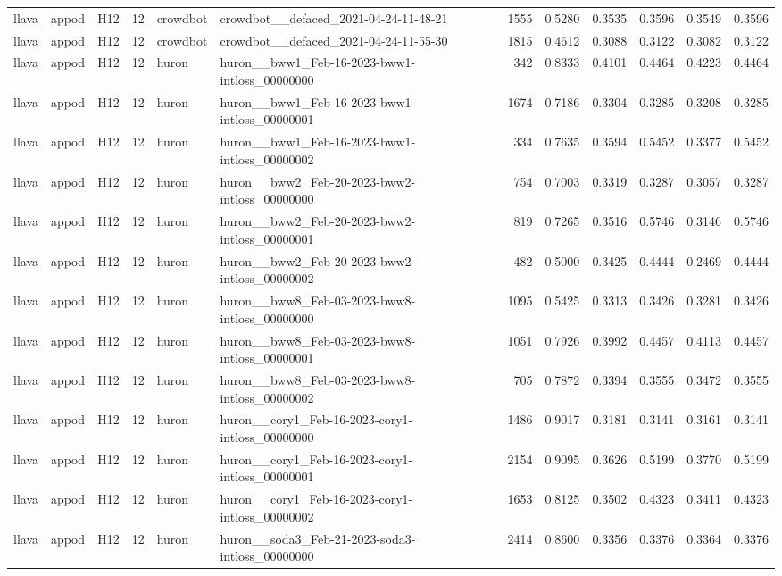 \begin{table}[tbp]
\begin{tabular}{lllrllrrrrrr}
llava & appod & H12 & 12 & crowdbot & crowdbot\_\_defaced\_2021-04-24-11-48-21 & 1555 & 0.5280 & 0.3535 & 0.3596 & 0.3549 & 0.3596 \\
llava & appod & H12 & 12 & crowdbot & crowdbot\_\_defaced\_2021-04-24-11-55-30 & 1815 & 0.4612 & 0.3088 & 0.3122 & 0.3082 & 0.3122 \\
llava & appod & H12 & 12 & huron & huron\_\_bww1\_Feb-16-2023-bww1-intloss\_00000000 & 342 & 0.8333 & 0.4101 & 0.4464 & 0.4223 & 0.4464 \\
llava & appod & H12 & 12 & huron & huron\_\_bww1\_Feb-16-2023-bww1-intloss\_00000001 & 1674 & 0.7186 & 0.3304 & 0.3285 & 0.3208 & 0.3285 \\
llava & appod & H12 & 12 & huron & huron\_\_bww1\_Feb-16-2023-bww1-intloss\_00000002 & 334 & 0.7635 & 0.3594 & 0.5452 & 0.3377 & 0.5452 \\
llava & appod & H12 & 12 & huron & huron\_\_bww2\_Feb-20-2023-bww2-intloss\_00000000 & 754 & 0.7003 & 0.3319 & 0.3287 & 0.3057 & 0.3287 \\
llava & appod & H12 & 12 & huron & huron\_\_bww2\_Feb-20-2023-bww2-intloss\_00000001 & 819 & 0.7265 & 0.3516 & 0.5746 & 0.3146 & 0.5746 \\
llava & appod & H12 & 12 & huron & huron\_\_bww2\_Feb-20-2023-bww2-intloss\_00000002 & 482 & 0.5000 & 0.3425 & 0.4444 & 0.2469 & 0.4444 \\
llava & appod & H12 & 12 & huron & huron\_\_bww8\_Feb-03-2023-bww8-intloss\_00000000 & 1095 & 0.5425 & 0.3313 & 0.3426 & 0.3281 & 0.3426 \\
llava & appod & H12 & 12 & huron & huron\_\_bww8\_Feb-03-2023-bww8-intloss\_00000001 & 1051 & 0.7926 & 0.3992 & 0.4457 & 0.4113 & 0.4457 \\
llava & appod & H12 & 12 & huron & huron\_\_bww8\_Feb-03-2023-bww8-intloss\_00000002 & 705 & 0.7872 & 0.3394 & 0.3555 & 0.3472 & 0.3555 \\
llava & appod & H12 & 12 & huron & huron\_\_cory1\_Feb-16-2023-cory1-intloss\_00000000 & 1486 & 0.9017 & 0.3181 & 0.3141 & 0.3161 & 0.3141 \\
llava & appod & H12 & 12 & huron & huron\_\_cory1\_Feb-16-2023-cory1-intloss\_00000001 & 2154 & 0.9095 & 0.3626 & 0.5199 & 0.3770 & 0.5199 \\
llava & appod & H12 & 12 & huron & huron\_\_cory1\_Feb-16-2023-cory1-intloss\_00000002 & 1653 & 0.8125 & 0.3502 & 0.4323 & 0.3411 & 0.4323 \\
llava & appod & H12 & 12 & huron & huron\_\_soda3\_Feb-21-2023-soda3-intloss\_00000000 & 2414 & 0.8600 & 0.3356 & 0.3376 & 0.3364 & 0.3376 \\

\end{tabular}
\end{table}
